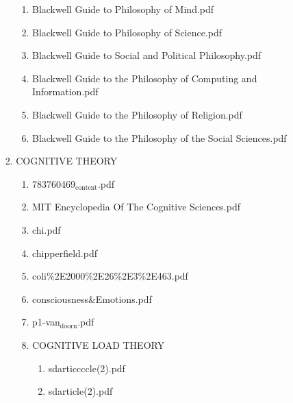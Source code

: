 \documentclass[11pt]{article}
\begin{document}
\begin{enumerate}
\begin{enumerate}
\begin{enumerate}
\begin{enumerate}
\begin{enumerate}
\item Blackwell Guide to Philosophy of Mind.pdf
\label{sec-1-1-1-1-7-3-17-5}

\item Blackwell Guide to Philosophy of Science.pdf
\label{sec-1-1-1-1-7-3-17-6}

\item Blackwell Guide to Social and Political Philosophy.pdf
\label{sec-1-1-1-1-7-3-17-7}

\item Blackwell Guide to the Philosophy of Computing and Information.pdf
\label{sec-1-1-1-1-7-3-17-8}

\item Blackwell Guide to the Philosophy of Religion.pdf
\label{sec-1-1-1-1-7-3-17-9}

\item Blackwell Guide to the Philosophy of the Social Sciences.pdf
\label{sec-1-1-1-1-7-3-17-10}
\end{enumerate}

\item COGNITIVE THEORY
\label{sec-1-1-1-1-7-3-18}
\begin{enumerate}
\item 783760469$_{\text{content}}$.pdf
\label{sec-1-1-1-1-7-3-18-1}

\item MIT Encyclopedia Of The Cognitive Sciences.pdf
\label{sec-1-1-1-1-7-3-18-2}

\item chi.pdf
\label{sec-1-1-1-1-7-3-18-3}

\item chipperfield.pdf
\label{sec-1-1-1-1-7-3-18-4}

\item coli\%2E2000\%2E26\%2E3\%2E463.pdf
\label{sec-1-1-1-1-7-3-18-5}

\item consciousness\&Emotions.pdf
\label{sec-1-1-1-1-7-3-18-6}

\item p1-van$_{\text{doorn}}$.pdf
\label{sec-1-1-1-1-7-3-18-7}

\item COGNITIVE LOAD THEORY
\label{sec-1-1-1-1-7-3-18-8}
\begin{enumerate}
\item sdarticcccle(2).pdf
\label{sec-1-1-1-1-7-3-18-8-1}

\item sdarticle(2).pdf
\label{sec-1-1-1-1-7-3-18-8-2}


\end{enumerate}
\end{enumerate}
\end{enumerate}
\end{enumerate}
\end{enumerate}
\end{enumerate}
\end{document}
